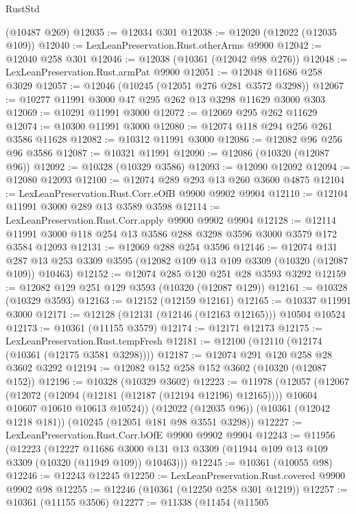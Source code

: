 \begin{lexlean}{RustStd}
\begin{coremodule}
    (@10487 @269)
@12035 := @12034 @301
@12038 := @12020 (@12022 (@12035 @109))
@12040 := LexLeanPreservation.Rust.otherArms @9900
@12042 := @12040 @258 @301
@12046 := @12038 (@10361 (@12042 @98 @276))
@12048 := LexLeanPreservation.Rust.armPat @9900
@12051 := @12048 @11686 @258 @3029
@12057 := @12046 (@10245 (@12051 @276 @281 @3572 @3298))
@12067 := @10277 @11991 @3000 @47 @295 @262 @13 @3298 @11629 @3000 @303
@12069 := @10291 @11991 @3000
@12072 := @12069 @295 @262 @11629
@12074 := @10300 @11991 @3000
@12080 := @12074 @118 @294 @256 @261 @3586 @11628
@12082 := @10312 @11991 @3000
@12086 := @12082 @96 @256 @96 @3586
@12087 := @10321 @11991
@12090 := @12086 (@10320 (@12087 @96))
@12092 := @10328 (@10329 @3586)
@12093 := @12090 @12092
@12094 := @12080 @12093
@12100 := @12074 @289 @293 @13 @260 @3600 @4875
@12104 := LexLeanPreservation.Rust.Corr.eOfB @9900 @9902 @9904
@12110 := @12104 @11991 @3000 @289 @13 @3589 @3598
@12114 := LexLeanPreservation.Rust.Corr.apply @9900 @9902 @9904
@12128 := @12114 @11991 @3000 @118 @254 @13 @3586 @288 @3298 @3596 @3000 @3579 @172 @3584 @12093
@12131 := @12069 @288 @254 @3596
@12146 := @12074
    @131
    @287
    @13
    @253
    @3309
    @3595
    (@12082 @109 @13 @109 @3309 (@10320 (@12087 @109)) @10463)
@12152 := @12074 @285 @120 @251 @28 @3593 @3292
@12159 := @12082 @129 @251 @129 @3593 (@10320 (@12087 @129))
@12161 := @10328 (@10329 @3593)
@12163 := @12152 (@12159 @12161)
@12165 := @10337 @11991 @3000
@12171 := @12128 (@12131 (@12146 (@12163 @12165))) @10504 @10524
@12173 := @10361 (@11155 @3579)
@12174 := @12171 @12173
@12175 := LexLeanPreservation.Rust.tempFresh
@12181 := @12100 (@12110 (@12174 (@10361 (@12175 @3581 @3298))))
@12187 := @12074 @291 @120 @258 @28 @3602 @3292
@12194 := @12082 @152 @258 @152 @3602 (@10320 (@12087 @152))
@12196 := @10328 (@10329 @3602)
@12223 := @11978
    (@12057
      (@12067
        (@12072 (@12094 (@12181 (@12187 (@12194 @12196) @12165))))
        @10604
        @10607
        @10610
        @10613
        @10524))
    (@12022 (@12035 @96))
    (@10361 (@12042 @1218 @181))
    (@10245 (@12051 @181 @98 @3551 @3298))
@12227 := LexLeanPreservation.Rust.Corr.bOfE @9900 @9902 @9904
@12243 := @11956
    (@12223
      (@12227
        @11686
        @3000
        @131
        @13
        @3309
        (@11944 @109 @13 @109 @3309 (@10320 (@11949 @109)) @10463)))
@12245 := @10361 (@10055 @98)
@12246 := @12243 @12245
@12250 := LexLeanPreservation.Rust.covered @9900 @9902 @98
@12255 := @12246 (@10361 (@12250 @258 @301 @1219))
@12257 := @10361 (@11155 @3506)
@12277 := @11338
    (@11454
      (@11505

\end{coremodule}
\end{lexlean}
